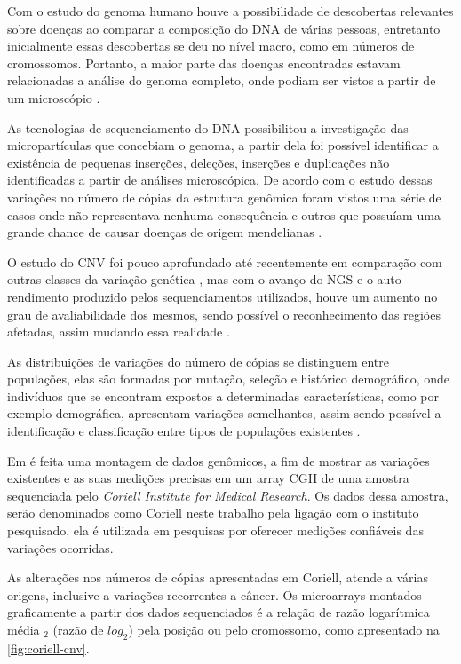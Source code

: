 Com o estudo do genoma humano \cite{Lander2001} houve a possibilidade de descobertas relevantes sobre doenças ao comparar a composição do DNA de várias pessoas, entretanto inicialmente essas descobertas se deu no nível macro, como em números de cromossomos. Portanto, a maior parte das doenças encontradas estavam relacionadas a análise do genoma completo, onde podiam ser vistos a partir de um microscópio \cite{Feuk2006}. 

As tecnologias de sequenciamento do DNA possibilitou a investigação das micropartículas que concebiam o genoma, a partir dela foi possível identificar a existência de pequenas inserções, deleções, inserções e duplicações não identificadas a partir de análises microscópica. De acordo com o estudo dessas variações no número de cópias da estrutura genômica foram vistos uma série de casos onde não representava nenhuma consequência e outros que possuíam uma grande chance de causar doenças de origem mendelianas \cite{Feuk2006,Xi2011}. 

O estudo do CNV foi pouco aprofundado até recentemente em comparação com outras classes da variação genética \cite{Redon2006}, mas com o avanço do NGS e o auto rendimento produzido pelos sequenciamentos utilizados, houve um aumento no grau de avaliabilidade dos mesmos, sendo possível o reconhecimento das regiões afetadas, assim mudando essa realidade \cite{Mills2011,Feuk2006}.

As distribuições de variações do número de cópias se distinguem entre populações, elas são formadas por mutação, seleção e histórico demográfico, onde indivíduos que se encontram expostos a determinadas características, como por exemplo demográfica, apresentam variações semelhantes, assim sendo possível a identificação e classificação entre tipos de populações existentes \cite{Redon2006}. 

Em \cite{Snijders2001} é feita uma montagem de dados genômicos, a fim de mostrar as variações existentes e as suas medições precisas em um array CGH de uma amostra sequenciada pelo \textit{Coriell Institute for Medical Research}. Os dados dessa amostra, serão denominados como Coriell neste trabalho pela ligação com o instituto pesquisado, ela é utilizada em pesquisas por oferecer medições confiáveis das variações ocorridas. 

As alterações nos números de cópias apresentadas em Coriell, atende a várias origens, inclusive a variações recorrentes a câncer. Os microarrays montados graficamente a partir dos dados sequenciados é a relação de razão logarítmica média $_2$ (razão de $log_{2}$) pela posição ou pelo cromossomo, como apresentado na \autoref{fig:coriell-cnv}.

